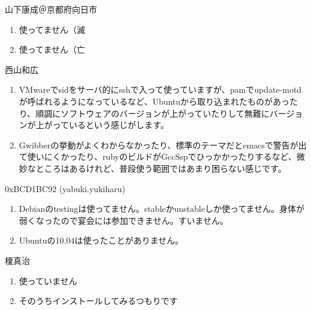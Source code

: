 \documentclass[mingoth,a4paper]{jsarticle}
\begin{document}
\begin{prework}{ 山下康成＠京都府向日市 }
    \begin{enumerate}
          \item 使ってません（滅
          \item 使ってません（亡
    \end{enumerate}
\end{prework}



\begin{prework}{ 西山和広 }

    \begin{enumerate}
          \item 
        VMwareでsidをサーバ的にsshで入って使っていますが、pamでupdate-motdが呼ばれるようになっているなど、Ubuntuから取り込まれたものがあったり、順調にソフトウェアのバージョンが上がっていたりして無難にバージョンが上がっているという感じがします。
          \item 
        Gwibberの挙動がよくわからなかったり、標準のテーマだとemacsで警告が出て使いにくかったり、rubyのビルドがGccSspでひっかかったりするなど、微妙なところはあるけれど、普段使う範囲ではあまり困らない感じです。
    \end{enumerate}

\end{prework}



\begin{prework}{ 0xBCD1BC92 (yabuki.yukiharu) }

    \begin{enumerate}
          \item 
        Debianのtestingは使ってません。stableかunstableしか使ってません。身体が弱くなったので宴会には参加できません。すいません。
          \item 
        Ubuntuの10.04は使ったことがありません。
    \end{enumerate}
\end{prework}



\begin{prework}{ 榎真治 }

    \begin{enumerate}
          \item 使っていません
          \item そのうちインストールしてみるつもりです
    \end{enumerate}
\end{prework}
\end{document}
